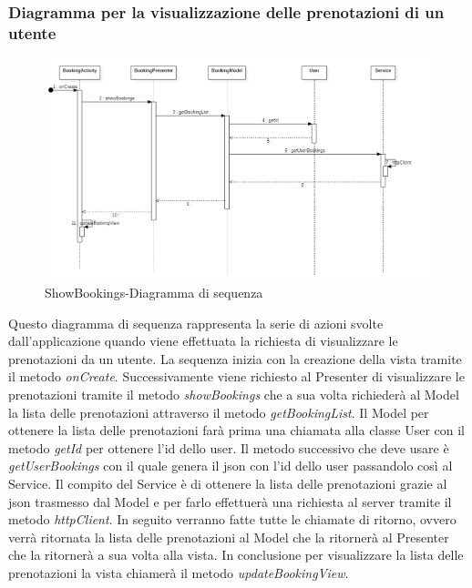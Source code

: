 \subsubsection{Diagramma per la visualizzazione delle prenotazioni di un utente}
\begin{figure}[H]
	\centering
	\includegraphics[width=16cm]{res/images/apputenti-showBookingsSeq.png}
	\caption{ShowBookings-Diagramma di sequenza}
	\label{fig:ShowBookings-Diagramma di sequenza}
\end{figure}
Questo diagramma di sequenza rappresenta la serie di azioni svolte dall'applicazione quando viene effettuata la richiesta di visualizzare le prenotazioni da un utente.
La sequenza inizia con la creazione della vista tramite il metodo \textit{onCreate}. Successivamente viene richiesto al Presenter di visualizzare le prenotazioni tramite il metodo \textit{showBookings} che a sua volta richiederà al Model la lista delle prenotazioni attraverso il metodo \textit{getBookingList}.
Il Model per ottenere la lista delle prenotazioni farà prima una chiamata alla classe User con il metodo \textit{getId} per ottenere l'id dello user.
Il metodo successivo che deve usare è \textit{getUserBookings} con il quale genera il json con l'id dello user passandolo così al Service.
Il compito del Service è di ottenere la lista delle prenotazioni grazie al json trasmesso dal Model e per farlo effettuerà una richiesta al server tramite il metodo \textit{httpClient}.
In seguito verranno fatte tutte le chiamate di ritorno, ovvero verrà ritornata la lista delle prenotazioni al Model che la ritornerà al Presenter che la ritornerà a sua volta alla vista.
In conclusione per visualizzare la lista delle prenotazioni la vista chiamerà il metodo \textit{updateBookingView}. 

